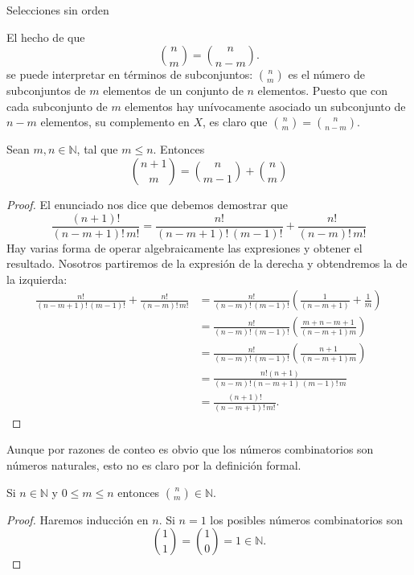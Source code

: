 \begin{section}{Selecciones sin orden}
\begin{nota}
El hecho  de que 
$$
\binom{n}{m} = \binom{n}{n-m}.
$$
se puede interpretar en términos de subconjuntos:  $\displaystyle\binom{n}{m}$ es el número de subconjuntos de $m$
ele\-men\-tos de un conjunto de $n$ elementos. Puesto que con cada subconjunto de $m$ ele\-men\-tos hay unívocamente asociado un subconjunto de $n - m$ elementos, su complemento en $X$, es claro que $\displaystyle\binom{n}{m} = \binom{n}{n-m}$.
\end{nota}


\begin{teorema} \label{teor-triangulo-de-pascal}
Sean $m,n \in \mathbb N$, tal que $m \le n$. Entonces
$$
\binom{n+1}{m} = \binom{n}{m-1} + \binom{n}{m}  
$$
\end{teorema}
\begin{proof}
El enunciado nos dice que debemos demostrar que 
\begin{equation*}
\frac{(n+1)!}{(n-m+1)!\,m!} = \frac{n!}{(n-m+1)!\,(m-1)!} +  \frac{n!}{(n-m)!\,m!}
\end{equation*}
Hay varias forma de operar algebraicamente las expresiones y obtener el resultado. Nosotros partiremos de la expresión de la derecha y obtendremos la de la izquierda:
\begin{align*}
\frac{n!}{(n-m+1)!\,(m-1)!} +  \frac{n!}{(n-m)!\,m!} &= \frac{n!}{(n-m)!\,(m-1)!}\left(\frac{1}{(n-m+1)} +  \frac{1}{m}\right)\\
&= \frac{n!}{(n-m)!\,(m-1)!}\left(\frac{m+n-m+1}{(n-m+1)m} \right) \\
& = \frac{n!}{(n-m)!\,(m-1)!}\left(\frac{n+1}{(n-m+1)m} \right) \\
& = \frac{n!(n+1)}{(n-m)!(n-m+1)\,(m-1)!\,m}\\
& = \frac{(n+1)!}{(n-m+1)!\,m!}.
\end{align*}

\end{proof}


Aunque por razones de conteo es obvio que los números combinatorios son números naturales, esto no es claro por la definición formal.  
\begin{corolario}
Si $n \in \mathbb N$ y $ 0\le m \le n$ entonces $\displaystyle\binom{n}{m} \in \mathbb N$.
\end{corolario}
\begin{proof}
Haremos inducción en $n$. Si $n = 1$ los posibles números
combinatorios son
$$
\binom{1}{1}  = \binom{1}{0}  = 1 \in \mathbb N.
$$


\end{proof}
\end{section}
